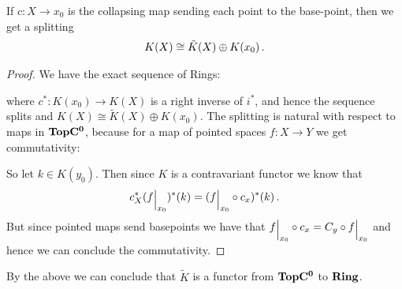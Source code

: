 \begin{cor}
	If $c:X\to x_0$ is the collapsing map sending each point to the base-point, then we get a splitting 
	\begin{align*}
		K(X)\cong \Tilde{K}(X) \oplus K(x_0) \, .
	\end{align*}  
\end{cor}
\begin{proof}
	We have the exact sequence of Rings:
	\begin{center}
	\end{center} where $c^*:K(x_0)\to K(X)$ is a right inverse of $i^*$, and hence the sequence splits and $K(X)\cong \tilde{K}(X)\oplus K(x_0)$. The splitting is natural with respect to maps in $\operatorname{\mathbf{TopC^0}}$, because for a map of pointed spaces $f:X\to Y$ we get commutativity:
	\begin{center}
	\end{center}
	So let $k\in K(y_0)$. Then since $K$ is a contravariant functor we know that $$c_X^*({f}\einsch{x_0})^*(k)=({f}\einsch{x_0}\circ c_x)^*(k)\, .$$ But since pointed maps send basepoints we have that ${f}\einsch{x_0}\circ c_x=C_y\circ {f}\einsch{x_0}$ and hence we can conclude the commutativity. 
\end{proof}
\begin{cor}
	By the above we can conclude that $\tilde{K}$ is a functor from $\operatorname{\mathbf{TopC^0}}$ to $\operatorname{\mathbf{Ring}}$.
\end{cor}

